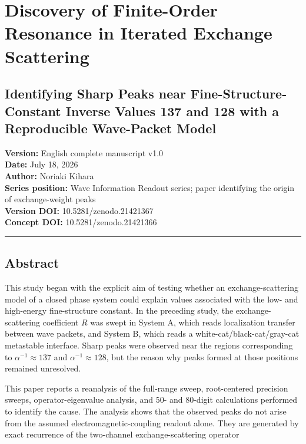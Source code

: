 \documentclass[
  10pt,
  a4paper,
]{article}
\author{}
\date{}
\begin{document}
\section{Discovery of Finite-Order Resonance in Iterated Exchange
Scattering}\label{discovery-of-finite-order-resonance-in-iterated-exchange-scattering}

\subsection{Identifying Sharp Peaks near Fine-Structure-Constant Inverse
Values 137 and 128 with a Reproducible Wave-Packet
Model}\label{identifying-sharp-peaks-near-fine-structure-constant-inverse-values-137-and-128-with-a-reproducible-wave-packet-model}

\textbf{Version:} English complete manuscript v1.0\\
\textbf{Date:} July 18, 2026\\
\textbf{Author:} Noriaki Kihara\\
\textbf{Series position:} Wave Information Readout series; paper
identifying the origin of exchange-weight peaks\\
\textbf{Version DOI:} 10.5281/zenodo.21421367\\
\textbf{Concept DOI:} 10.5281/zenodo.21421366

\begin{center}\rule{0.5\linewidth}{0.5pt}\end{center}

\subsection{Abstract}\label{abstract}

This study began with the explicit aim of testing whether an
exchange-scattering model of a closed phase system could explain values
associated with the low- and high-energy fine-structure constant. In the
preceding study, the exchange-scattering coefficient \(R\) was swept in
System A, which reads localization transfer between wave packets, and
System B, which reads a white-cat/black-cat/gray-cat metastable
interface. Sharp peaks were observed near the regions corresponding to
\(\alpha^{-1}\approx137\) and \(\alpha^{-1}\approx128\), but the reason
why peaks formed at those positions remained unresolved.

This paper reports a reanalysis of the full-range sweep, root-centered
precision sweeps, operator-eigenvalue analysis, and 50- and 80-digit
calculations performed to identify the cause. The analysis shows that
the observed peaks do not arise from the assumed
electromagnetic-coupling readout alone. They are generated by exact
recurrence of the two-channel exchange-scattering operator
\end{document}
